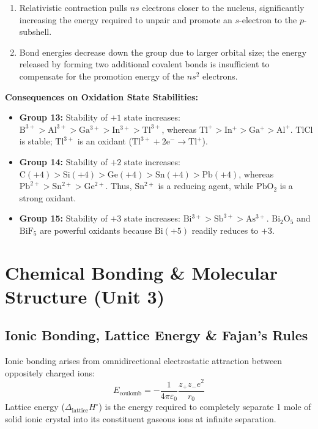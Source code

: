 \documentclass[10pt,twoside,openright]{book}
\begin{document}
\begin{itemize}
\begin{enumerate}
    \item Relativistic contraction pulls $ns$ electrons closer to the nucleus, significantly increasing the energy required to unpair and promote an $s$-electron to the $p$-subshell.
    \item Bond energies decrease down the group due to larger orbital size; the energy released by forming two additional covalent bonds is insufficient to compensate for the promotion energy of the $ns^2$ electrons.
  \end{enumerate}
  \textbf{Consequences on Oxidation State Stabilities:}
  \begin{itemize}
    \item \textbf{Group 13:} Stability of $+1$ state increases: $\mathrm{B^{3+}} > \mathrm{Al^{3+}} > \mathrm{Ga^{3+}} > \mathrm{In^{3+}} > \mathrm{Tl^{3+}}$, whereas $\mathbf{\mathrm{Tl^+}} > \mathbf{\mathrm{In^+}} > \mathbf{\mathrm{Ga^+}} > \mathbf{\mathrm{Al^+}}$. $\mathrm{TlCl}$ is stable; $\mathrm{Tl^{3+}}$ is an oxidant ($\mathrm{Tl^{3+} + 2e^- \to Tl^+}$).
    \item \textbf{Group 14:} Stability of $+2$ state increases: $\mathrm{C(+4)} > \mathrm{Si(+4)} > \mathrm{Ge(+4)} > \mathrm{Sn(+4)} > \mathrm{Pb(+4)}$, whereas $\mathbf{\mathrm{Pb^{2+}}} > \mathbf{\mathrm{Sn^{2+}}} > \mathbf{\mathrm{Ge^{2+}}}$. Thus, $\mathrm{Sn^{2+}}$ is a reducing agent, while $\mathrm{PbO_2}$ is a strong oxidant.
    \item \textbf{Group 15:} Stability of $+3$ state increases: $\mathbf{\mathrm{Bi^{3+}}} > \mathbf{\mathrm{Sb^{3+}}} > \mathbf{\mathrm{As^{3+}}}$. $\mathrm{Bi_2O_5}$ and $\mathrm{BiF_5}$ are powerful oxidants because $\mathrm{Bi(+5)}$ readily reduces to $+3$.
  \end{itemize}
\end{itemize}

\section{Chemical Bonding \& Molecular Structure (Unit 3)}

\subsection{Ionic Bonding, Lattice Energy \& Fajan's Rules}
Ionic bonding arises from omnidirectional electrostatic attraction between oppositely charged ions:
\begin{equation}
  E_{\text{coulomb}} = -\frac{1}{4\pi\varepsilon_0}\frac{z_+ z_- e^2}{r_0}
\end{equation}
Lattice energy ($\Delta_{\text{lattice}} H^\circ$) is the energy required to completely separate 1 mole of solid ionic crystal into its constituent gaseous ions at infinite separation.
\end{document}
